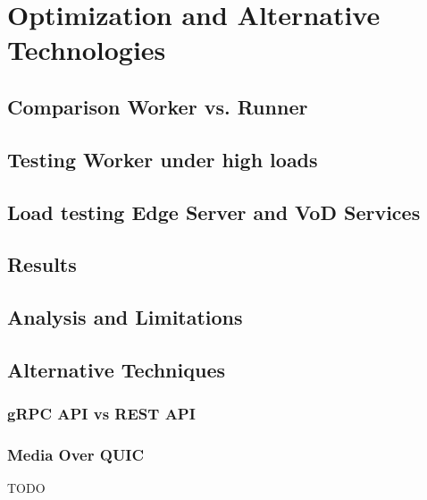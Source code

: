 
\chapter{Optimization and Alternative Technologies}\label{chapter:introduction}

\section{Comparison Worker vs. Runner}
\section{Testing Worker under high loads}
\section{Load testing Edge Server and VoD Services}
\section{Results}
\section{Analysis and Limitations}
\section{Alternative Techniques}
\subsection{gRPC API vs REST API}
\subsection{Media Over QUIC}

TODO